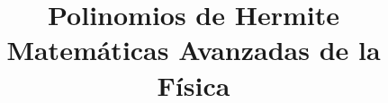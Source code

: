 
\usepackage{mathrsfs}
\usepackage{bigints}
\usepackage{standalone}
\usetikzlibrary{decorations}
\usetikzlibrary{decorations.pathreplacing}
\newcommand{\saltosin}{\nonumber \\}
\newtheorem{teorema}{{\it Teorema}}[section]
\title{Polinomios de Hermite \\ {\large Matemáticas Avanzadas de la Física}}
\date{ }

\renewcommand\labelenumii{\theenumi.{\arabic{enumii}}}
\maketitle
\fontsize{14}{14}\selectfont
